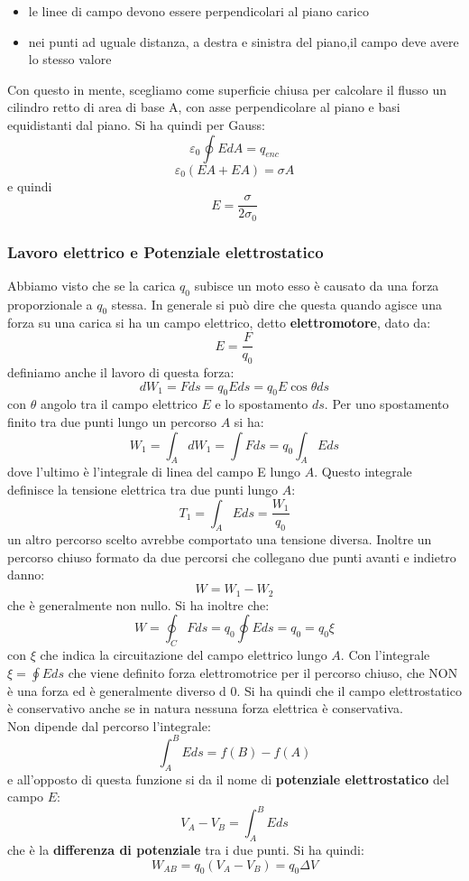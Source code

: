\documentclass[a4paper,12pt, oneside]{book}
\begin{document}
\begin{itemize}
\begin{itemize}
\item le linee di campo devono essere perpendicolari al piano carico 
\item nei punti ad uguale distanza, a destra e sinistra del piano,il campo deve avere lo stesso valore  
\end{itemize}
Con questo in mente, scegliamo come superficie chiusa per calcolare il flusso un cilindro retto di area di base A, con asse perpendicolare al piano e basi equidistanti dal piano. Si ha quindi per Gauss:
$$\varepsilon_0\oint EdA=q_{enc}$$
$$\varepsilon_0(EA+EA)=\sigma A$$
e quindi
$$E=\frac{\sigma}{2\sigma_0}$$
\end{itemize}
\newpage
\subsubsection{Lavoro elettrico e Potenziale elettrostatico}
Abbiamo visto che se la carica $q_0$ subisce un moto esso è causato da una forza proporzionale a $q_0$ stessa. In generale si può dire che questa quando agisce una forza su una carica si ha un campo elettrico, detto \textbf{elettromotore}, dato da:
$$E=\frac{F}{q_0}$$
definiamo anche il lavoro di questa forza:
$$dW_1=Fds=q_0Eds=q_0E\cos \theta ds$$
con $\theta$ angolo tra il campo elettrico $E$ e lo spostamento $ds$. Per uno spostamento finito tra due punti lungo un percorso $A$ si ha:
$$W_1=\int_A dW_1=\int Fds=q_0\int_A Eds$$
dove l'ultimo è l'integrale di linea del campo E lungo $A$. Questo integrale definisce la tensione elettrica tra due punti lungo $A$:
$$T_1=\int_AEds=\frac{W_1}{q_0}$$
un altro percorso scelto avrebbe comportato una tensione diversa. Inoltre un percorso chiuso formato da due percorsi che collegano due punti avanti e indietro danno:
$$W=W_1-W_2$$
che è generalmente non nullo. Si ha inoltre che:
$$W=\oint_C Fds=q_0\oint Eds=q_0=q_0\xi$$
con $\xi$ che indica la circuitazione del campo elettrico lungo $A$. Con l'integrale $\xi=\oint Eds$ che viene definito forza elettromotrice per il percorso chiuso, che NON è una forza ed è generalmente diverso d 0. Si ha quindi che il campo elettrostatico è conservativo anche se in natura nessuna forza elettrica è conservativa.\\
Non dipende dal percorso l'integrale:
$$\int_A^B Eds=f(B)-f(A)$$
e all'opposto di questa funzione si da il nome di \textbf{potenziale elettrostatico} del campo $E$:
$$V_A-V_B=\int_A^B Eds$$
che è la \textbf{differenza di potenziale} tra i due punti. Si ha quindi:
$$W_{AB}=q_0(V_A-V_B)=q_0\Delta V$$
\end{document}
